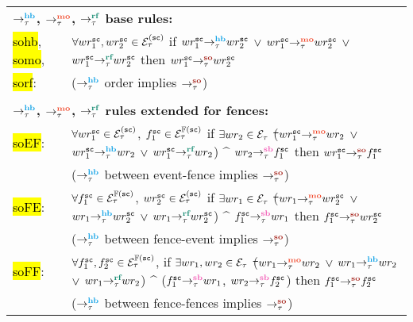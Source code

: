 \begin{longtable}{|p{} p{}|}
	\hline
	\multicolumn{2}{|l|}{\bf $\setHB$, $\setMO$, $\setRF$ base rules:}\\
	
	\hl{sohb}, \hl{somo},  & 
	$\forall wr^{\texttt{sc}}_1, wr^{\texttt{sc}}_2 \in \mathcal{E}^{(\texttt{sc})}_\tau$ if 
	$\hb{\tau}{wr^{\sc}_1}{wr^{\sc}_2}$ $\vee$ $\mo{\tau}{wr^{\sc}_1}{wr^{\sc}_2}$
	$\vee$ $\rf{\tau}{wr^{\sc}_1}{wr^{\sc}_2}$ then 
	$\so{\tau}{wr^{\sc}_1}{wr^{\sc}_2}$ \\
	\hl{sorf}: & ($\setHB$ order implies $\setSO$) \\
	
%	
	& \\
	
	\multicolumn{2}{|l|}{\bf $\setHB$, $\setMO$, $\setRF$ rules extended
		for fences:} \\
	
	\hl{soEF}: & $\forall wr^\texttt{sc}_1 \in \mathcal{E}^{(\texttt{sc})}_\tau$, $f^\texttt{sc}_1 \in
	\mathcal{E}^{\mathbb{F}(\texttt{sc})}_\tau$ if $\exists wr_2 \in \mathcal{E}_\tau$ \st 
	($\mo{\tau}{wr^\sc_1}{wr_2}$ $\vee$ $\hb{\tau}{wr^\sc_1}{wr_2}$
	$\vee$ $\rf{\tau}{wr^\sc_1}{wr_2}$) $\^$ $\seqb{\tau}{wr_2}{f^\sc_1}$ 
	then $\so{\tau}{wr^\sc_1}{f^\sc_1}$ \\
	& ($\setHB$ between \sc event-fence implies $\setSO$) \\
	
	\hl{soFE}: & $\forall f^\texttt{sc}_1 \in \mathcal{E}^{\mathbb{F}(\texttt{sc})}_\tau$, $wr^\texttt{sc}_2 \in
	\mathcal{E}^{(\texttt{sc})}_\tau$ if $\exists wr_1 \in \mathcal{E}_\tau$ \st 
	($\mo{\tau}{wr_1}{wr^\sc_2}$ $\vee$ $\hb{\tau}{wr_1}{wr^\sc_2}$
	$\vee$ $\rf{\tau}{wr_1}{wr^\sc_2}$) $\^$ $\seqb{\tau}{f^\sc_1}{wr_1}$ 
	then $\so{\tau}{f^\sc_1}{wr^\sc_2}$ \\
	& ($\setHB$ between fence-\sc event implies $\setSO$) \\
	
	\hl{soFF}: & $\forall f^{\texttt{sc}}_1, f^{\texttt{sc}}_2 \in \mathcal{E}^{\mathbb{F}(\texttt{sc})}_\tau$, 
	if $\exists wr_1, wr_2 \in \mathcal{E}_\tau$ \st 
	($\mo{\tau}{wr_1}{wr_2}$ $\vee$ $\hb{\tau}{wr_1}{wr_2}$
	$\vee$ $\rf{\tau}{wr_1}{wr_2}$) $\^$
	($\seqb{\tau}{f^{\sc}_1}{wr_1}$, $\seqb{\tau}{wr_2}{f^{\sc}_2}$) 
	then $\so{\tau}{f^{\sc}_1}{f^{\sc}_2}$ \\
	& ($\setHB$ between \sc fence-fences implies $\setSO$) \\
	\hline
\end{longtable}
	
